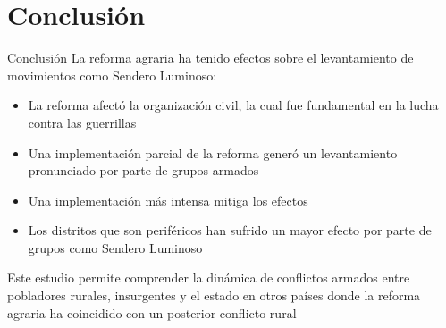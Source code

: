 \documentclass[aspectratio=169,t]{beamer}
\begin{document}
\section{Conclusión}
\begin{frame}{Conclusión}
  La reforma agraria ha tenido efectos sobre el levantamiento de movimientos como Sendero Luminoso:
  \begin{itemize}
      \item La reforma afectó la organización civil, la cual fue fundamental en la lucha contra las guerrillas
      \item Una implementación parcial de la reforma generó un levantamiento pronunciado por parte de grupos armados
      \item Una implementación más intensa mitiga los efectos
      \item Los distritos que son periféricos han sufrido un mayor efecto por parte de grupos como Sendero Luminoso
  \end{itemize}
  Este estudio permite comprender la dinámica de conflictos armados entre pobladores rurales, insurgentes y el estado en otros países donde la reforma agraria ha coincidido con un posterior conflicto rural
\end{frame}
\end{document}
